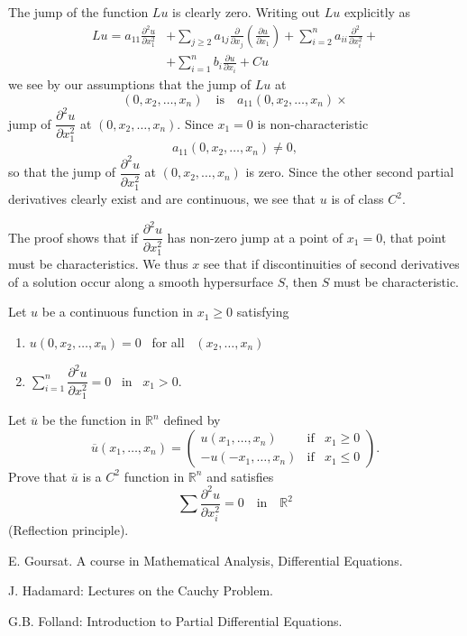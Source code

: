 The jump of the function $Lu$ is clearly zero. Writing out $Lu$ explicitly as
\begin{align*}
Lu = a_{11}\frac{\partial^{2}u}{\partial x^{2}_{1}} &+ \sum\limits_{j\geq 2}a_{1j}\frac{\partial}{\partial x_{j}}\left(\frac{\partial u}{\partial x_{1}}\right)+\sum\limits^{n}_{i=2}a_{ii}\frac{\partial^{2}}{\partial x^{2}_{i}}+\\[3pt]
&+ \sum\limits^{n}_{i=1}b_{i}\frac{\partial u}{\partial x_{i}}+Cu
\end{align*}
we see by our assumptions that the jump of $Lu$ at 
$$
(0,x_{2},\ldots,x_{n})\quad\text{is}\quad a_{11}(0,x_{2},\ldots,x_{n})\times
$$
jump of $\dfrac{\partial^{2}u}{\partial x^{2}_{1}}$ at $(0,x_{2},\ldots,x_{n})$. Since $x_{1}=0$ is non-characteristic 
$$
a_{11}(0,x_{2},\ldots,x_{n})\neq 0,
$$
so that the jump of $\dfrac{\partial^{2}u}{\partial x^{2}_{1}}$ at $(0,x_{2},\ldots,x_{n})$ is zero. Since the other second partial derivatives clearly exist and are continuous, we see that $u$ is of class $C^{2}$.

\begin{remark*}
The proof shows that if $\dfrac{\partial^{2}u}{\partial x^{2}_{1}}$ has non-zero jump at a point of $x_{1}=0$, that point must be characteristics. We thus $x$ see that if discontinuities of second derivatives of a solution occur along a smooth hypersurface $S$, then $S$ must be characteristic.
\end{remark*}

\begin{exer*}
Let $u$ be a continuous function in $x_{1}\geq 0$ satisfying
\begin{enumerate}
\renewcommand{\labelenumi}{(\theenumi)}
\item $u(0,x_{2},\ldots,x_{n})=0$ \ for all \ $(x_{2},\ldots,x_{n})$

\item $\sum\limits^{n}_{i=1}\dfrac{\partial^{2}u}{\partial x^{2}_{1}}=0$ \ in \ $x_{1}>0$.
\end{enumerate}
\end{exer*}

Let $\overline{u}$ be the function in $\mathbb{R}^{n}$ defined by
$$
\overline{u}(x_{1},\ldots,x_{n})=
\left(
\begin{array}{ccc}
u(x_{1},\ldots,x_{n}) & \text{if} & x_{1}\geq 0\\[3pt]
-u(-x_{1},\ldots,x_{n}) & \text{if} & x_{1}\leq 0
\end{array}
\right).
$$
Prove that $\overline{u}$ is a $C^{2}$ function in $\mathbb{R}^{n}$ and satisfies 
$$
\sum \frac{\partial^{2}u}{\partial x^{2}_{i}}=0\quad\text{in}\quad \mathbb{R}^{2}
$$
(Reflection principle).


\begin{thebibliography}{99}
 E. Goursat. A course in Mathematical Analysis, Differential Equations.

 J. Hadamard: Lectures on the Cauchy Problem.

 G.B. Folland: Introduction to Partial Differential Equations.
\end{thebibliography}
